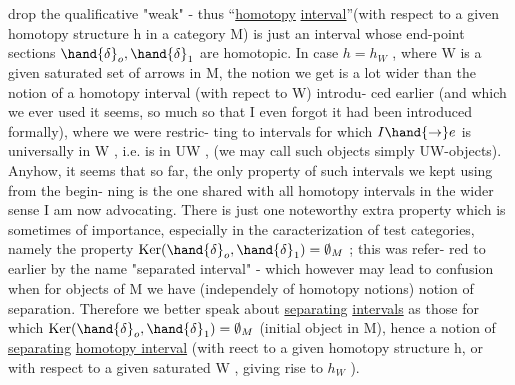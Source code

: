 
drop the qualificative "weak" - thus   ``\uline{homotopy} \uline{interval}''(with respect
to a given homotopy structure h in a category M) is just an interval
whose end-point sections $\hand{\delta}_o,\hand{\delta}_1$ are homotopic. In case $h=h_W$ , where W
is a given saturated set of arrows in M, the notion we get is a lot 
wider than the notion of a homotopy interval (with repect to W) introdu-%
ced earlier  (and which we  ever used it seems, so much so that
I even forgot  it had been introduced formally), where we were restric-%
ting to intervals for which $I \hand{\to} e$ is universally in W , i.e. is in UW ,
(we may call such objects simply UW-objects). Anyhow, it seems that so
far, the only property of such intervals we kept using from the begin-%
ning  is the one shared with all homotopy intervals in the wider
sense I am now advocating. There is just one noteworthy extra property
which is sometimes of importance, especially in the caracterization of
test categories, namely the property $\mathrm{Ker}(\hand{\delta}_o,\hand{\delta}_1) = \emptyset_M$ ; this was refer-%
red to earlier by the name "separated interval" - which however may
lead to confusion when for objects of M we have (independely of homotopy
notions)  notion of separation. Therefore we better speak about
\uline{separating} \uline{intervals} as those for which $\mathrm{Ker}(\hand{\delta}_o,\hand{\delta}_1) = \emptyset_M$ (initial object
in M), hence a notion of \uline{separating} \uline{homotopy interval} (with reect to
a given homotopy structure h, or with respect to a given saturated W ,
giving rise to $h_W$ ).

